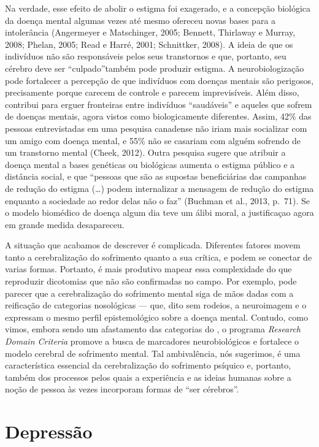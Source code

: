 Na verdade, esse efeito de abolir o estigma foi exagerado, e a concepção
biológica da doença mental algumas vezes até mesmo ofereceu novas bases
para a intolerância (Angermeyer e Matschinger, 2005; Bennett, Thirlaway
e Murray, 2008; Phelan, 2005; Read e Harré, 2001; Schnittker, 2008). A
ideia de que os indivíduos não são responsáveis pelos seus transtornos e
que, portanto, seu cérebro deve ser ``culpado''também pode produzir
estigma. A neurobiologização pode fortalecer a percepção de que
indivíduos com doenças mentais são perigosos, precisamente porque
carecem de controle e parecem imprevisíveis. Além disso, contribui para
erguer fronteiras entre indivíduos ``saudáveis'' e aqueles que sofrem de
doenças mentais, agora vistos como biologicamente diferentes. Assim,
42\% das pessoas entrevistadas em uma pesquisa canadense não iriam mais
socializar com um amigo com doença mental, e 55\% não se casariam com
alguém sofrendo de um transtorno mental (Cheek, 2012). Outra pesquisa
sugere que atribuir a doença mental a bases genéticas ou biológicas
aumenta o estigma público e a distância social, e que ``pessoas que são
as supostas beneficiárias das campanhas de redução do estigma (\ldots{})
podem internalizar a mensagem de redução do estigma enquanto a sociedade
ao redor delas não o faz'' (Buchman et al., 2013, p.~71). Se o modelo
biomédico de doença algum dia teve um álibi moral, a justificaçao agora
em grande medida desapareceu.

A situação que acabamos de descrever é complicada. Diferentes fatores
movem tanto a cerebralização do sofrimento quanto a sua crítica, e podem
se conectar de varias formas. Portanto, é mais produtivo mapear essa
complexidade do que reproduzir dicotomias que não são confirmadas no
campo. Por exemplo, pode parecer que a cerebralização do sofrimento
mental siga de mãos dadas com a reificação de categorias nosológicas ---
que, dito sem rodeios, a neuroimagem e o \emph{} expressam o mesmo
perfil epistemológico sobre a doença mental. Contudo, como vimos, embora
sendo um afastamento das categorias do \emph{}, o programa
\emph{Research Domain Criteria} promove a busca de marcadores
neurobiológicos e fortalece o modelo cerebral de sofrimento mental. Tal
ambivalência, nós sugerimos, é uma característica essencial da
cerebralização do sofrimento psíquico e, portanto, também dos processos
pelos quais a experiência e as ideias humanas sobre a noção de pessoa às
vezes incorporam formas de ``ser cérebros''.

\section{Depressão}

